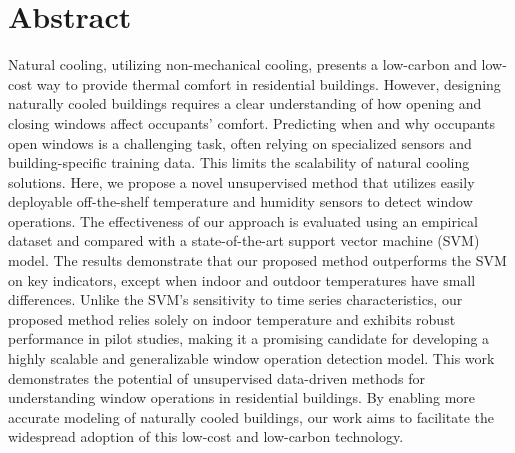 \documentclass[sigconf]{acmart}
\begin{document}


\hypertarget{abstract}{%
\section{Abstract}\label{abstract}}

Natural cooling, utilizing non-mechanical cooling, presents a low-carbon
and low-cost way to provide thermal comfort in residential buildings.
However, designing naturally cooled buildings requires a clear
understanding of how opening and closing windows affect occupants'
comfort. Predicting when and why occupants open windows is a challenging
task, often relying on specialized sensors and building-specific
training data. This limits the scalability of natural cooling solutions.
Here, we propose a novel unsupervised method that utilizes easily
deployable off-the-shelf temperature and humidity sensors to detect
window operations. The effectiveness of our approach is evaluated using
an empirical dataset and compared with a state-of-the-art support vector
machine (SVM) model. The results demonstrate that our proposed method
outperforms the SVM on key indicators, except when indoor and outdoor
temperatures have small differences. Unlike the SVM's sensitivity to
time series characteristics, our proposed method relies solely on indoor
temperature and exhibits robust performance in pilot studies, making it
a promising candidate for developing a highly scalable and generalizable
window operation detection model. This work demonstrates the potential
of unsupervised data-driven methods for understanding window operations
in residential buildings. By enabling more accurate modeling of
naturally cooled buildings, our work aims to facilitate the widespread
adoption of this low-cost and low-carbon technology.
\end{document}
